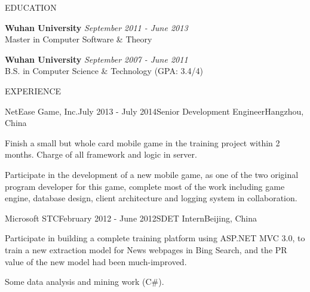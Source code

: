 \documentclass{resume} %
\begin{document}
\begin{rSection}{EDUCATION}

{\bf Wuhan University} \hfill {\em September 2011 - June 2013} \\
Master in Computer Software \& Theory
\vspace{0.3em}

{\bf Wuhan University} \hfill {\em September 2007 - June 2011} \\
B.S. in Computer Science \& Technology (GPA: 3.4/4)
\vspace{0.5em}

\end{rSection}

\begin{rSection}{EXPERIENCE}

\begin{rSubsection}{NetEase Game, Inc.}{July 2013 - July 2014}{Senior Development Engineer}{Hangzhou, China}
\item Finish a small but whole card mobile game in the training project within 2 months. Charge of all framework and logic in server.
\item Participate in the development of a new mobile game, as one of the two original program developer for this game, complete most of the work including game engine, database design, client architecture and logging system in collaboration.
    
\end{rSubsection}
\begin{rSubsection}{Microsoft STC}{February 2012 - June 2012}{SDET Intern}{Beijing, China}
\item Participate in building a complete training platform using ASP.NET MVC 3.0, to train a new extraction model for News webpages in Bing Search, and the PR value of the new model had been much-improved.
\item Some data analysis and mining work (C\#).
\end{rSubsection}

\end{rSection}
\end{document}
